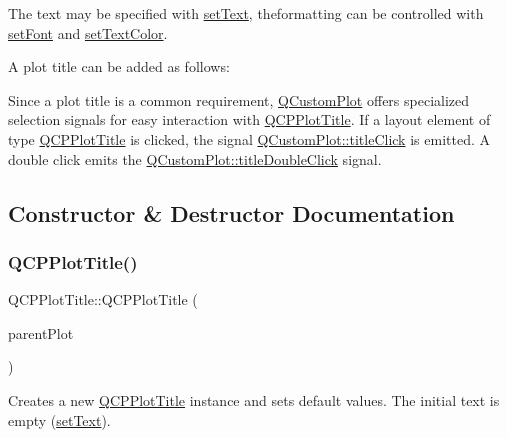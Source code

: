 The text may be specified with \hyperlink{class_q_c_p_plot_title_aae5a93e88050dfb2cbf6adc087516821}{set\+Text}, theformatting can be controlled with \hyperlink{class_q_c_p_plot_title_a199fc7170802ea65006c371875349e37}{set\+Font} and \hyperlink{class_q_c_p_plot_title_a71273e3a0ca6b4c151591b37b9e5ce33}{set\+Text\+Color}.

A plot title can be added as follows\+: 
\begin{DoxyCodeInclude}
\end{DoxyCodeInclude}
 Since a plot title is a common requirement, \hyperlink{class_q_custom_plot}{Q\+Custom\+Plot} offers specialized selection signals for easy interaction with \hyperlink{class_q_c_p_plot_title}{Q\+C\+P\+Plot\+Title}. If a layout element of type \hyperlink{class_q_c_p_plot_title}{Q\+C\+P\+Plot\+Title} is clicked, the signal \hyperlink{class_q_custom_plot_a2137a819e518fee7edd1c0bf5984d8d6}{Q\+Custom\+Plot\+::title\+Click} is emitted. A double click emits the \hyperlink{class_q_custom_plot_ad51d65f6abf5edfaeef6e0519a4c1a2f}{Q\+Custom\+Plot\+::title\+Double\+Click} signal. 

\subsection{Constructor \& Destructor Documentation}
\hypertarget{class_q_c_p_plot_title_aaae17bee2de6d6a1e695f76fb1abed03}{}\label{class_q_c_p_plot_title_aaae17bee2de6d6a1e695f76fb1abed03} 
\subsubsection{\texorpdfstring{Q\+C\+P\+Plot\+Title()}{QCPPlotTitle()}\hspace{0.1cm}{\footnotesize\ttfamily [1/2]}}
{\footnotesize\ttfamily Q\+C\+P\+Plot\+Title\+::\+Q\+C\+P\+Plot\+Title (\begin{DoxyParamCaption}\item[{\hyperlink{class_q_custom_plot}{Q\+Custom\+Plot} $\ast$}]{parent\+Plot }\end{DoxyParamCaption})\hspace{0.3cm}{\ttfamily [explicit]}}

Creates a new \hyperlink{class_q_c_p_plot_title}{Q\+C\+P\+Plot\+Title} instance and sets default values. The initial text is empty (\hyperlink{class_q_c_p_plot_title_aae5a93e88050dfb2cbf6adc087516821}{set\+Text}).


